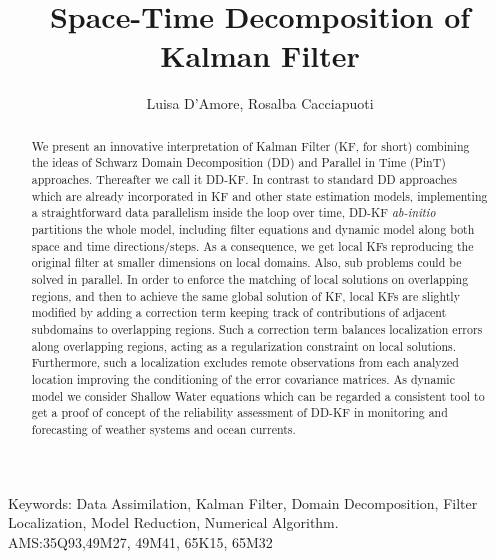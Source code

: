 \documentclass[smallcondensed]{svjour3}
\begin{document}
\title{Space-Time  Decomposition of Kalman Filter 
}


\author{Luisa D'Amore, Rosalba Cacciapuoti}
\maketitle

\renewcommand{\thefootnote}{\fnsymbol{footnote}}

\begin{abstract}
  We present an innovative interpretation of Kalman Filter (KF, for short) combining  the ideas of Schwarz Domain Decomposition (DD) and Parallel in Time (PinT)  approaches. Thereafter  we call it  DD-KF. In contrast to  standard DD approaches  which are already incorporated in KF and other state estimation models, implementing a straightforward data parallelism inside the loop over time, DD-KF  \emph{ab-initio} partitions  the whole model,  including  filter equations and dynamic  model along both space and time directions/steps. As a consequence,  we  get  local KFs  reproducing the original filter at smaller dimensions on local domains. Also,  sub problems could be solved in parallel.  In order to enforce the matching of local solutions
on  overlapping regions, and then  to  achieve the same global solution of KF,   local KFs are slightly modified by adding a
correction term keeping track of contributions of adjacent subdomains to  overlapping regions. Such a correction term balances localization errors along overlapping regions, acting as a regularization constraint on local solutions. Furthermore,  such a localization excludes remote observations from each analyzed location improving the conditioning of the error covariance matrices. 
As dynamic model we consider Shallow Water equations which can be regarded a consistent tool to get a proof of concept of the reliability assessment  of DD-KF  in monitoring and forecasting of weather systems and ocean currents. \end{abstract}

\noindent Keywords:
Data Assimilation, Kalman Filter,  Domain Decomposition, Filter Localization, Model Reduction, Numerical Algorithm.\\
AMS:35Q93,49M27, 49M41, 65K15, 65M32
\end{document}
